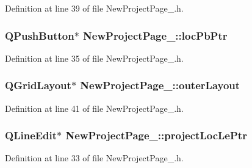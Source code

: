 Definition at line 39 of file New\-Project\-Page\-\_.\-h.

\hypertarget{class_new_project_page__2_ab5056e3d84ca52cffb2842c398ee04b2}{
\subsubsection[{loc\-Pb\-Ptr}]{\setlength{\rightskip}{0pt plus 5cm}Q\-Push\-Button$\ast$ New\-Project\-Page\-\_\-::loc\-Pb\-Ptr\hspace{0.3cm}{\ttfamily [private]}}}\label{class_new_project_page__2_ab5056e3d84ca52cffb2842c398ee04b2}


Definition at line 35 of file New\-Project\-Page\-\_.\-h.

\hypertarget{class_new_project_page__2_a59c64379dca8c4bf52e60503b76da65e}{
\subsubsection[{outer\-Layout}]{\setlength{\rightskip}{0pt plus 5cm}Q\-Grid\-Layout$\ast$ New\-Project\-Page\-\_\-::outer\-Layout\hspace{0.3cm}{\ttfamily [private]}}}\label{class_new_project_page__2_a59c64379dca8c4bf52e60503b76da65e}


Definition at line 41 of file New\-Project\-Page\-\_.\-h.

\hypertarget{class_new_project_page__2_a86200aed0b692c71dffa0664fa18e25e}{
\subsubsection[{project\-Loc\-Le\-Ptr}]{\setlength{\rightskip}{0pt plus 5cm}Q\-Line\-Edit$\ast$ New\-Project\-Page\-\_\-::project\-Loc\-Le\-Ptr\hspace{0.3cm}{\ttfamily [private]}}}\label{class_new_project_page__2_a86200aed0b692c71dffa0664fa18e25e}


Definition at line 33 of file New\-Project\-Page\-\_.\-h.

